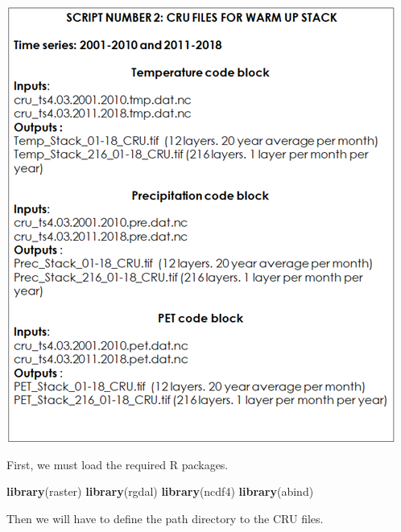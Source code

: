 \documentclass[
  10pt,
  b5paper,
]{book}
\newenvironment{Shaded}{\begin{snugshade}}{\end{snugshade}}
\newcommand{\KeywordTok}[1]{\textcolor[rgb]{0.13,0.29,0.53}{\textbf{#1}}}
\newcommand{\NormalTok}[1]{#1}
\begin{document}
\includegraphics{tables/Table_9.2.png}

First, we must load the required R packages.

\begin{Shaded}
\begin{Highlighting}[]
\KeywordTok{library}\NormalTok{(raster)}
\KeywordTok{library}\NormalTok{(rgdal)}
\KeywordTok{library}\NormalTok{(ncdf4)}
\KeywordTok{library}\NormalTok{(abind)}
\end{Highlighting}
\end{Shaded}

Then we will have to define the path directory to the CRU files.
\end{document}

